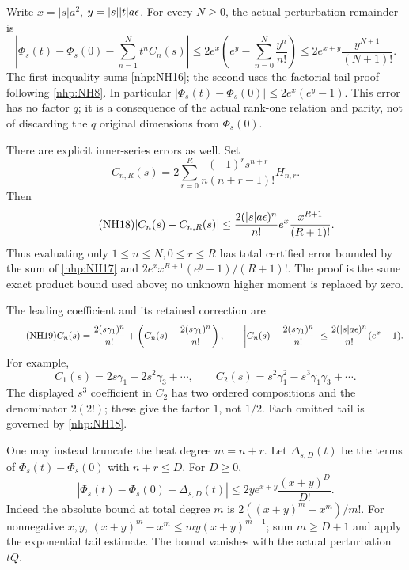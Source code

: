 Write \(x=|s|a^2\), \(y=|s||t|a\epsilon\).
For every \(N\ge0\), the actual perturbation remainder is
\begin{equation}\tag{NH17}\label{nhp:NH17}
\left|\Phi_s(t)-\Phi_s(0)-\sum_{n=1}^N t^n C_n(s)\right|
\le 2e^x\left(e^y-\sum_{n=0}^N\frac{y^n}{n!}\right)
\le2e^{x+y}\frac{y^{N+1}}{(N+1)!}.
\end{equation}
The first inequality sums \eqref{nhp:NH16}; the second
uses the factorial tail proof following \eqref{nhp:NH8}.
In particular
\(|\Phi_s(t)-\Phi_s(0)|\le2e^x(e^y-1)\).
This error has no factor \(q\); it is a consequence of
the actual rank-one relation and parity, not of discarding
the \(q\) original dimensions from \(\Phi_s(0)\).

There are explicit inner-series errors as well. Set
\[
C_{n,R}(s)=2\sum_{r=0}^{R}
\frac{(-1)^rs^{n+r}}{n(n+r-1)!}H_{n,r}.
\]
Then
\begin{equation}\tag{NH18}\label{nhp:NH18}
|C_n(s)-C_{n,R}(s)|
\le\frac{2(|s|a\epsilon)^n}{n!}
e^x\frac{x^{R+1}}{(R+1)!}.
\end{equation}
Thus evaluating only \(1\le n\le N,0\le r\le R\)
has total certified error bounded by the sum of
\eqref{nhp:NH17} and
\(2e^x x^{R+1}(e^y-1)/(R+1)!\).
The proof is the same exact product bound used above;
no unknown higher moment is replaced by zero.

The leading coefficient and its retained correction are
\begin{equation}\tag{NH19}\label{nhp:NH19}
C_n(s)=\frac{2(s\gamma_1)^n}{n!}
+\left(C_n(s)-\frac{2(s\gamma_1)^n}{n!}\right),\qquad
\left|C_n(s)-\frac{2(s\gamma_1)^n}{n!}\right|
\le\frac{2(|s|a\epsilon)^n}{n!}(e^x-1).
\end{equation}
For example,
\begin{equation}\tag{NH20}\label{nhp:NH20}
C_1(s)=2s\gamma_1-2s^2\gamma_3+\cdots,\qquad
C_2(s)=s^2\gamma_1^2-s^3\gamma_1\gamma_3+\cdots .
\end{equation}
The displayed \(s^3\) coefficient in \(C_2\) has two
ordered compositions and the denominator \(2(2!)\);
these give the factor \(1\), not \(1/2\).
Each omitted tail is governed by \eqref{nhp:NH18}.

One may instead truncate the heat degree \(m=n+r\).
Let \(\Delta_{s,D}(t)\) be the terms of
\(\Phi_s(t)-\Phi_s(0)\) with \(n+r\le D\).
For \(D\ge0\),
\begin{equation}\tag{NH21}\label{nhp:NH21}
|\Phi_s(t)-\Phi_s(0)-\Delta_{s,D}(t)|
\le 2y e^{x+y}\frac{(x+y)^D}{D!}.
\end{equation}
Indeed the absolute bound at total degree \(m\) is
\(2((x+y)^m-x^m)/m!\).
For nonnegative \(x,y\),
\((x+y)^m-x^m\le my(x+y)^{m-1}\);
sum \(m\ge D+1\) and apply the exponential tail estimate.
The bound vanishes with the actual perturbation \(tQ\).

